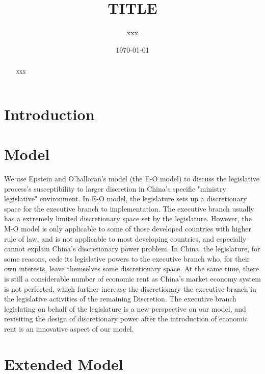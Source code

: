 \documentclass[11pt,en,authoryear]{elegantpaper}
\title{TITLE}
\author{xxx}
\institute{NID}
\date{\today}
\begin{document}
\maketitle

\begin{abstract}
xxx
\end{abstract}


\section{Introduction}


\section{Model}

We use Epstein and O'halloran's model (the E-O model) to discuss the legislative process's susceptibility to larger discretion in China's specific "ministry legislative" environment. In E-O model, the legislature sets up a discretionary space for the executive branch to implementation. The executive branch usually has a extremely limited discretionary space set by the legislature. However, the M-O model is only applicable to some of those developed countries with higher rule of law, and is not applicable to most developing countries, and especially cannot explain China's discretionary power problem. In China, the legislature, for some reasons, cede its legislative powers to the executive branch who, for their own interests, leave themselves some discretionary space. At the same time, there is still a considerable number of economic rent as China's market economy system is not perfected, which further increase the discretionary  the executive branch in the legislative activities of the remaining Discretion. The executive branch legislating on behalf of the legislature is a new perspective on our model, and revisiting the design of discretionary power after the introduction of economic rent is an innovative aspect of our model.



\section{Extended Model}
\end{document}
